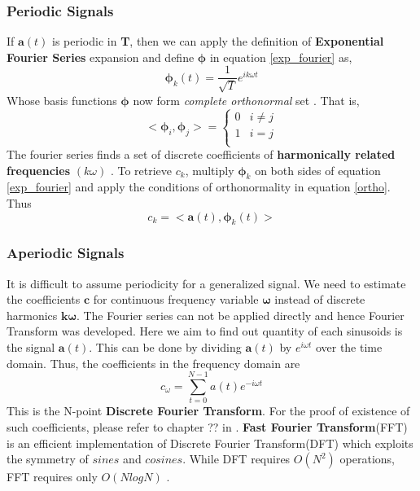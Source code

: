 \subsubsection{Periodic Signals}
If $\textbf{a}(t)$ is periodic in \textbf{T}, then we can apply the definition of \textbf{Exponential Fourier Series} expansion and define $\bm{\phi}$ in equation \ref{exp_fourier} as,
\begin{equation}
\bm{\phi}_{k}(t) = \frac{1}{\sqrt{T}}e^{ik \omega t}
\end{equation}    
Whose basis functions $\bm{\phi}$ now form \textit{complete orthonormal} set \cite{allen}. That is, 
\begin{equation}
\label{ortho}
 < \bm{\phi}_{i}, \bm{\phi}_{j} > =
	\begin{cases}
	  0 & i \neq j \\
	  1 &  i = j \\ 
	\end{cases}
\end{equation}
The fourier series finds a set of discrete coefficients of \textbf{harmonically related frequencies} $(k \omega )$ . To retrieve $c_{k}$, multiply $\bm{\phi}_{k}$ on both sides of equation \ref{exp_fourier} and apply the conditions of orthonormality in equation \ref{ortho}. Thus
\begin{equation}
c_{k} = <\textbf{a}(t), \bm{\phi}_{k}(t)>
\end{equation}


\subsubsection{Aperiodic Signals}
It is difficult to assume periodicity for a generalized signal. We need to estimate the coefficients $\textbf{c}$ for continuous frequency variable $\bm{\omega}$ instead of discrete harmonics $\textbf{k}\bm{\omega}$. The Fourier series can not be applied directly and hence Fourier Transform was developed. Here we aim to find out quantity of each sinusoids is the signal $\textbf{a}(t)$. This can be done by dividing  $\textbf{a}(t)$ by $e^{i \omega t}$ over the time domain. Thus, the coefficients in the frequency domain are 
\begin{equation}
c_{\omega} =  \displaystyle\sum_{t=0}^{N-1}a(t)e^{-i \omega t}
\end{equation}  
This is the N-point \textbf{Discrete Fourier Transform}. For the proof of existence of such coefficients, please refer to chapter ?? in \cite{allen}. \textbf{Fast Fourier Transform}(FFT) is an efficient implementation of Discrete Fourier Transform(DFT) which exploits the symmetry of $sines$ and $cosines$. While DFT requires $O(N^2)$ operations, FFT requires only $O(NlogN)$ \cite{allen}.  

